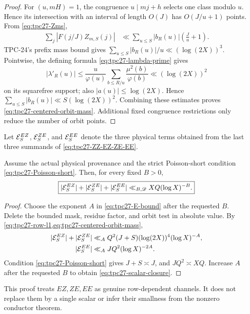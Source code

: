 \begin{proof}
For \((u,mH)=1\), the congruence \(u\mid mj+h\) selects one class
modulo \(u\).  Hence its intersection with an interval of length
\(O(J)\) has \(O(J/u+1)\) points.  From
\eqref{eq:tpc27-Zms},
\begin{align*}
 \sum_j|F(j/J)Z_{m,S}(j)|
 &\ll
 \sum_{u\le S}|b_R(u)|\left(\frac Ju+1\right).
\end{align*}
TPC-24's prefix mass bound gives
\(\sum_{u\le S}|b_R(u)|/u\ll(\log(2X))^3\).  Pointwise, the defining
formula \eqref{eq:tpc27-lambda-prime} gives
\[
 |\lambda'_R(u)|
 \le \frac{u}{\varphi(u)}
 \sum_{b\le R/u}\frac{\mu^2(b)}{\varphi(b)}
 \ll (\log(2X))^2
\]
on its squarefree support; also \(|a(u)|\le\log(2X)\).  Hence
\(\sum_{u\le S}|b_R(u)|\ll S(\log(2X))^2\).  Combining these
estimates proves \eqref{eq:tpc27-centered-orbit-mass}.  Additional
fixed congruence restrictions only reduce the number of orbit points.
\end{proof}

Let \(\mathcal E_S^{EZ}\), \(\mathcal E_S^{ZE}\), and \(\mathcal E_S^{EE}\) denote the
three physical terms obtained from the last three summands of
\eqref{eq:tpc27-ZZ-EZ-ZE-EE}.

\begin{theorem}
\label{thm:tpc27-scalar-closure}
Assume the actual physical provenance and the strict Poisson-short
condition \eqref{eq:tpc27-Poisson-short}.  Then, for every fixed
\(B>0\),
\begin{equation}
 \boxed{
 |\mathcal E_S^{EZ}|+|\mathcal E_S^{ZE}|+|\mathcal E_S^{EE}|
 \ll_{B,\mathscr D}XQ(\log X)^{-B}.}
 \label{eq:tpc27-scalar-closure}
\end{equation}
\end{theorem}

\begin{proof}
Choose the exponent \(A\) in \eqref{eq:tpc27-E-bound} after the
requested \(B\).  Delete the bounded mask, residue factor, and orbit
test in absolute value.  By
\cref{eq:tpc27-row-l1,eq:tpc27-centered-orbit-mass},
\begin{align}
 |\mathcal E_S^{EZ}|+|\mathcal E_S^{ZE}|
 &\ll_A
 Q^2(J+S)(\log(2X))^4(\log X)^{-A},
 \label{eq:tpc27-EZ-bound}\\
 |\mathcal E_S^{EE}|
 &\ll_A
 JQ^2(\log X)^{-2A}.
 \label{eq:tpc27-EE-bound}
\end{align}
Condition \eqref{eq:tpc27-Poisson-short} gives \(J+S\asymp J\), and
\(JQ^2\asymp XQ\).  Increase \(A\) after the requested \(B\) to
obtain \eqref{eq:tpc27-scalar-closure}.
\end{proof}

This proof treats \(EZ,ZE,EE\) as genuine row-dependent channels.  It
does not replace them by a single scalar or infer their smallness from
the nonzero conductor theorem.
